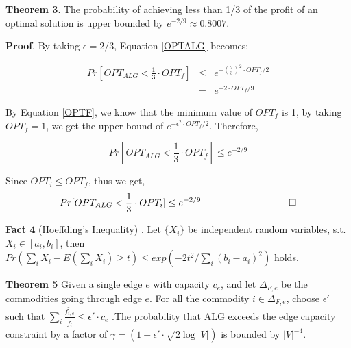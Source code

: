 \documentclass[conference]{IEEEtran}
\newcommand*{\QEDB}{\hfill\ensuremath{\square}}%
\begin{document}
\textbf{Theorem 3}. The probability of achieving less than 1/3 of the profit of an optimal solution is upper bounded by $e^{-2/9} \approx 0.8007$.

\textbf{Proof}.
By taking $\epsilon = 2/3$, Equation \ref{OPTALG} becomes:

\begin{eqnarray}
Pr[OPT_{ALG}  < \frac{1}{3} \cdot OPT_f] &\le& e^{-(\frac{2}{3})^2 \cdot OPT_f / 2} \\
&=& e^{-2 \cdot OPT_f/9}
\end{eqnarray}

By Equation \ref{OPTF}, we know that the minimum value of $OPT_f$ is 1, by taking $OPT_f = 1$, we get the upper bound of $e^{-\epsilon^2 \cdot OPT_f / 2}$. Therefore,

\begin{equation}
Pr[OPT_{ALG}  < \frac{1}{3} \cdot OPT_f] \le e^{-2/9}
\end{equation}

Since $OPT_i \le OPT_f$, thus we get, 
\begin{equation}
Pr[OPT_{ALG}  < \frac{1}{3} \cdot OPT_i] \le e^{-2/9}
\,\,\,\,\,\,\,\,\,\,\,\,\,\,\,\,\,\,\,\,\,\,\,\,\,\,\,\,\,\,\,\,\,\,\,\,\,\,\,\,\,\,\,\,\,\,\,\,\,\,\,\,\,\,\,\QEDB \nonumber
\end{equation}



%

\vspace*{0.15in}
\textbf{Fact 4} (Hoeffding's Inequality)\cite{Devdatt} . Let $\{X_i\}$ be independent random variables, s.t. $X_i \in [a_i, b_i]$, then $Pr(\sum_{i}X_i - E(\sum_{i}X_i ) \ge t) \le exp(-2t^2 / \sum_{i}(b_i-a_i)^2 )$ holds.

\vspace*{0.15in}
\textbf{Theorem 5} Given a single edge $e$ with capacity $c_e$, and let $\Delta_{F,e}$ be the commodities going through edge $e$. For all the commodity $i \in \Delta_{F,e}$, choose $\epsilon'$ such that $\sum_i \frac{\tilde{f_{i,e}}}{\tilde{f_i}} \le \epsilon' \cdot c_e$ .The probability that ALG exceeds the edge capacity constraint by a factor of $\gamma = (1+\epsilon' \cdot \sqrt{2\log|V|})$ is bounded by $|V|^{-4}$.
\vspace*{0.15in}
\end{document}
